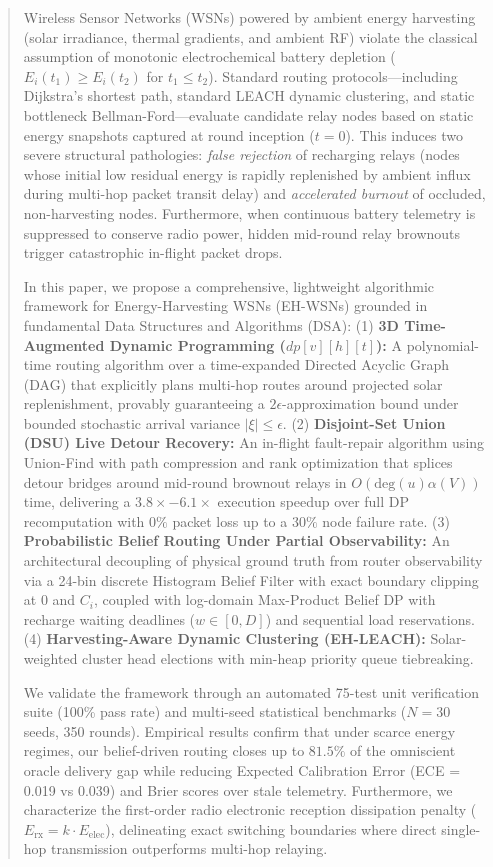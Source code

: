 \documentclass[journal]{IEEEtran}
\begin{document}
\begin{abstract}
Wireless Sensor Networks (WSNs) powered by ambient energy harvesting (solar irradiance, thermal gradients, and ambient RF) violate the classical assumption of monotonic electrochemical battery depletion ($E_i(t_1) \ge E_i(t_2)$ for $t_1 \le t_2$). Standard routing protocols---including Dijkstra's shortest path, standard LEACH dynamic clustering, and static bottleneck Bellman-Ford---evaluate candidate relay nodes based on static energy snapshots captured at round inception ($t=0$). This induces two severe structural pathologies: \textit{false rejection} of recharging relays (nodes whose initial low residual energy is rapidly replenished by ambient influx during multi-hop packet transit delay) and \textit{accelerated burnout} of occluded, non-harvesting nodes. Furthermore, when continuous battery telemetry is suppressed to conserve radio power, hidden mid-round relay brownouts trigger catastrophic in-flight packet drops.

In this paper, we propose a comprehensive, lightweight algorithmic framework for Energy-Harvesting WSNs (EH-WSNs) grounded in fundamental Data Structures and Algorithms (DSA):
(1) \textbf{3D Time-Augmented Dynamic Programming ($dp[v][h][t]$):} A polynomial-time routing algorithm over a time-expanded Directed Acyclic Graph (DAG) that explicitly plans multi-hop routes around projected solar replenishment, provably guaranteeing a $2\epsilon$-approximation bound under bounded stochastic arrival variance $|\xi| \le \epsilon$.
(2) \textbf{Disjoint-Set Union (DSU) Live Detour Recovery:} An in-flight fault-repair algorithm using Union-Find with path compression and rank optimization that splices detour bridges around mid-round brownout relays in $O(\text{deg}(u)\alpha(V))$ time, delivering a $3.8\times - 6.1\times$ execution speedup over full DP recomputation with $0\%$ packet loss up to a $30\%$ node failure rate.
(3) \textbf{Probabilistic Belief Routing Under Partial Observability:} An architectural decoupling of physical ground truth from router observability via a 24-bin discrete Histogram Belief Filter with exact boundary clipping at 0 and $C_i$, coupled with log-domain Max-Product Belief DP with recharge waiting deadlines ($w \in [0, D]$) and sequential load reservations.
(4) \textbf{Harvesting-Aware Dynamic Clustering (EH-LEACH):} Solar-weighted cluster head elections with min-heap priority queue tiebreaking.

We validate the framework through an automated 75-test unit verification suite (100\% pass rate) and multi-seed statistical benchmarks ($N=30$ seeds, 350 rounds). Empirical results confirm that under scarce energy regimes, our belief-driven routing closes up to $81.5\%$ of the omniscient oracle delivery gap while reducing Expected Calibration Error (ECE = 0.019 vs 0.039) and Brier scores over stale telemetry. Furthermore, we characterize the first-order radio electronic reception dissipation penalty ($E_{\text{rx}} = k \cdot E_{\text{elec}}$), delineating exact switching boundaries where direct single-hop transmission outperforms multi-hop relaying.
\end{abstract}
\end{document}
